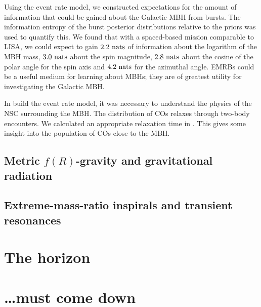 Using the event rate model, we constructed expectations for the amount of information that could be gained about the Galactic MBH from bursts. The information entropy of the burst posterior distributions relative to the priors was used to quantify this. We found that with a spaced-based mission comparable to LISA, we could expect to gain $2.2~\mathrm{nats}$ of information about the logarithm of the MBH mass, $3.0~\mathrm{nats}$ about the spin magnitude, $2.8~\mathrm{nats}$ about the cosine of the polar angle for the spin axis and $4.2~\mathrm{nats}$ for the azimuthal angle. EMRBs could be a useful medium for learning about MBHs; they are of greatest utility for investigating the Galactic MBH.

In build the event rate model, it was necessary to understand the physics of the NSC surrounding the MBH. The distribution of COs relaxes through two-body encounters. We calculated an appropriate relaxation time in . This gives some insight into the population of COs close to the MBH.

\subsection{Metric $f(R)$-gravity and gravitational radiation}\label{sec:Review-f-R}

\subsection{Extreme-mass-ratio inspirals and transient resonances}\label{sec:Review-resonances}

\section{The horizon}

\section{\ldots must come down}